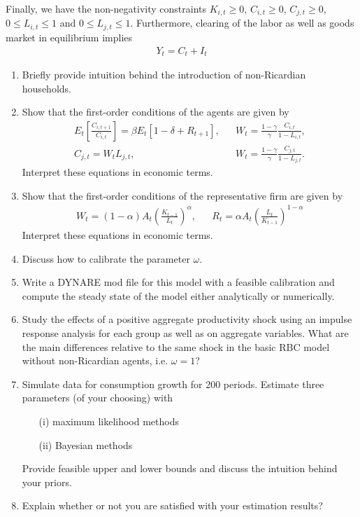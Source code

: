 \documentclass[a4paper]{scrartcl}
\begin{document}
Finally, we have the non-negativity constraints	$K_{i,t} \geq0$, $C_{i,t} \geq 0$, $C_{j,t} \geq 0$, $0\leq L_{i,t} \leq 1$ and $0\leq L_{j,t} \leq 1$. Furthermore, clearing of the labor as well as goods market in equilibrium implies
\begin{align*}
Y_t = C_t + I_t
\end{align*}

\begin{enumerate}
	\item Briefly provide intuition behind the introduction of non-Ricardian households.
	\item Show that the first-order conditions of the agents are given by
		\begin{align*}
		E_t\left[\frac{C_{i,t+1}}{C_{i,t}}\right] = \beta E_t\left[1-\delta + R_{t+1}\right],&&		
		W_t = \frac{1-\gamma}{\gamma} \frac{C_{i,t}}{1-L_{i,t}},\\
		C_{j,t} = W_t L_{j,t}, &&
		W_t = \frac{1-\gamma}{\gamma} \frac{C_{j,t}}{1-L_{j,t}}.
		\end{align*}
	Interpret these equations in economic terms.
	
	\item Show that the first-order conditions of the representative firm are given by
	\begin{align*}
	W_t = (1-\alpha) A_t \left(\frac{K_{t-1}}{L_t}\right)^\alpha, &&	R_t = \alpha A_t \left(\frac{L_t}{K_{t-1}}\right)^{1-\alpha}
	\end{align*}
	Interpret these equations in economic terms.
	\item Discuss how to calibrate the parameter $\omega$.
	\item Write a DYNARE mod file for this model with a feasible calibration and compute the steady state of the model either analytically or numerically.
	\item Study the effects of a positive aggregate productivity shock using an impulse response analysis for each group as well as on aggregate variables. What are the main differences relative to the same shock in the basic RBC model without non-Ricardian agents, i.e. $\omega=1$?
	\item Simulate data for consumption growth for 200 periods. Estimate three parameters (of your choosing) with 
	\begin{itemize}
		\item[(i)] maximum likelihood methods
		\item[(ii)] Bayesian methods
	\end{itemize}
	Provide feasible upper and lower bounds and discuss the intuition behind your priors. 
	\item Explain whether or not you are satisfied with your estimation results?
\end{enumerate} 
\newpage
\end{document}
